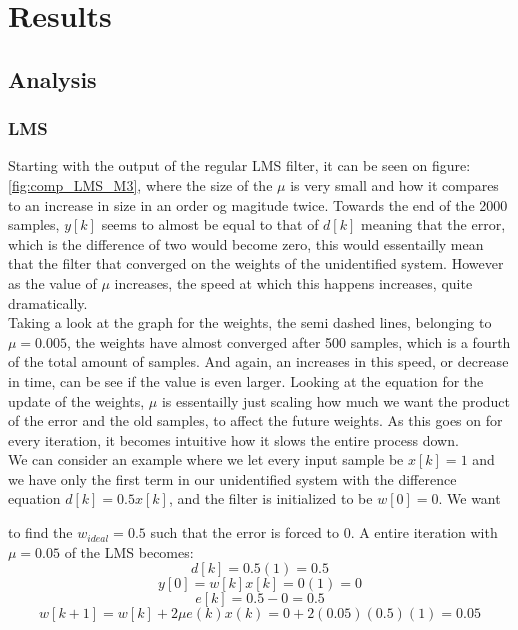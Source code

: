 \section{Results}
\subsection{Analysis}
\subsubsection{LMS}
Starting with the output of the regular LMS filter, it can be seen on figure:\ref{fig:comp_LMS_M3}, 
where the size of the $\mu$ is very small and how it compares to an increase in size in an order og magitude
twice. Towards the end of the 2000 samples, $y[k]$ seems to almost be equal to that of $d[k]$ meaning that
the error, which is the difference of two would become zero, this would essentailly mean that the filter
that converged on the weights of the unidentified system. However as the value of $\mu$ increases, the speed 
at which this happens increases, quite dramatically.\\

Taking a look at the graph for the weights, the semi dashed lines, belonging to $\mu = 0.005$, the weights have almost converged after 500 samples, which is a fourth of 
the total amount of samples. And again, an increases in this speed, or decrease in time, can be see if the
value is even larger. Looking at the equation for the update of the weights, $\mu$ is 
essentailly just scaling how much we want the product of the error and the old samples,
to affect the future weights. As this goes on for every iteration, it becomes intuitive how it
slows the entire process down.
\\

We can consider an example where we let every input sample be $x[k] = 1$ and we have only the first term in our
unidentified system with the difference equation $d[k]= 0.5x[k]$, and the filter is initialized to be $w[0] = 0$. We want 

to find the $w_{ideal} = 0.5$ such that the error is forced to 0.
A entire iteration with $\mu=0.05$ of the LMS becomes:
\[d[k] = 0.5(1) = 0.5\]
\[y[0] = w[k]x[k] = 0(1) = 0\]
\[e[k] = 0.5 - 0 = 0.5\]
\[w[k+1] = w[k] + 2\mu e(k)x(k) = 0 + 2(0.05)(0.5)(1) = 0.05 \]


